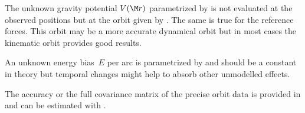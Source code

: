 The unknown gravity potential $V(\M r)$ parametrized by 
is not evaluated at the observed positions but at the orbit given by .
The same is true for the reference forces. This orbit may be a more accurate dynamical orbit but
in most cases the kinematic orbit provides good results.

An unknown energy bias~$E$ per arc is parametrized by 
and should be a constant in theory but temporal changes might help to absorb other unmodelled effects.

The accuracy or the full covariance matrix of the precise orbit data is provided in
 and can be estimated with .


